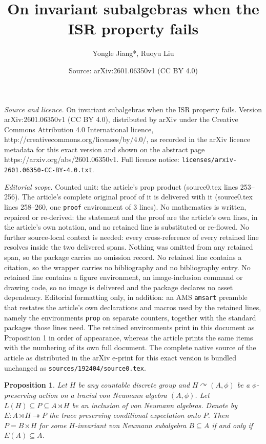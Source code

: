 \documentclass[10pt,a4paper]{amsart}
\title{On invariant subalgebras when the ISR property fails}
\author{Yongle Jiang*, Ruoyu Liu}
\date{Source: arXiv:2601.06350v1 (CC BY 4.0)}
\newtheorem{prop}{Proposition}
\begin{document}
\maketitle

\noindent\emph{Source and licence.} On invariant subalgebras when the ISR property fails. Version arXiv:2601.06350v1 (CC BY 4.0), distributed by arXiv under the Creative Commons Attribution 4.0 International licence, http://creativecommons.org/licenses/by/4.0/, as recorded in the arXiv licence metadata for this exact version and shown on the abstract page https://arxiv.org/abs/2601.06350v1. Full licence notice: \texttt{licenses/arxiv-2601.06350-CC-BY-4.0.txt}.\par\smallskip

\noindent\textit{Editorial scope.} Counted unit: the article's prop product (source0.tex lines 253--256). The article's complete original proof of it is delivered with it (source0.tex lines 258--260, one \texttt{proof} environment of 3 lines). No mathematics is written, repaired or re-derived: the statement and the proof are the article's own lines, in the article's own notation, and no retained line is substituted or re-flowed.  No further source-local context is needed: every cross-reference of every retained line resolves inside the two delivered spans.  Nothing was omitted from any retained span, so the package carries no omission record.  No retained line contains a citation, so the wrapper carries no bibliography and no bibliography entry.  No retained line contains a figure environment, an image-inclusion command or drawing code, so no image is delivered and the package declares no asset dependency.  Editorial formatting only, in addition: an AMS \texttt{amsart} preamble that restates the article's own declarations and macros used by the retained lines, namely the environments \texttt{prop} on separate counters, together with the standard packages those lines need.  The retained environments print in this document as Proposition 1 in order of appearance, whereas the article prints the same items with the numbering of its own full document.  The complete native source of the article as distributed in the arXiv e-print for this exact version is bundled unchanged as \texttt{sources/192404/source0.tex}.
\begin{prop}\label{prop: detect crossed product}
Let $H$ be any countable discrete group and $H\curvearrowright (A,\phi)$ be a $\phi$-preserving action on a tracial von Neumann algebra $(A,\phi)$.
Let $L(H)\subseteq P\subseteq A\rtimes H$ be an inclusion of von Neumann algebras. Denote by $E: A\rtimes H\twoheadrightarrow P$ the trace preserving conditional expectation onto $P$. Then $P=B\rtimes H$ for some $H$-invariant von Neumann subalgebra $B\subseteq A$ if and only if $E(A)\subseteq A$.
\end{prop}
\end{document}
